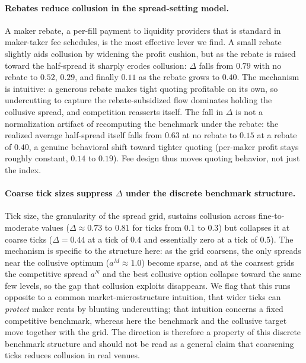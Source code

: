 \documentclass[sigconf]{acmart}
\begin{document}
\paragraph{Rebates reduce collusion in the spread-setting model.} A maker rebate, a per-fill payment to liquidity providers that is standard in maker-taker fee schedules, is the most effective lever we find. A small rebate slightly aids collusion by widening the profit cushion, but as the rebate is raised toward the half-spread it sharply erodes collusion: $\Delta$ falls from $0.79$ with no rebate to $0.52$, $0.29$, and finally $0.11$ as the rebate grows to $0.40$. The mechanism is intuitive: a generous rebate makes tight quoting profitable on its own, so undercutting to capture the rebate-subsidized flow dominates holding the collusive spread, and competition reasserts itself. The fall in $\Delta$ is not a normalization artifact of recomputing the benchmark under the rebate: the realized average half-spread itself falls from $0.63$ at no rebate to $0.15$ at a rebate of $0.40$, a genuine behavioral shift toward tighter quoting (per-maker profit stays roughly constant, $0.14$ to $0.19$). Fee design thus moves quoting behavior, not just the index.

\paragraph{Coarse tick sizes suppress $\Delta$ under the discrete benchmark structure.} Tick size, the granularity of the spread grid, sustains collusion across fine-to-moderate values ($\Delta \approx 0.73$ to $0.81$ for ticks from $0.1$ to $0.3$) but collapses it at coarse ticks ($\Delta = 0.44$ at a tick of $0.4$ and essentially zero at a tick of $0.5$). The mechanism is specific to the structure here: as the grid coarsens, the only spreads near the collusive optimum ($a^M \approx 1.0$) become sparse, and at the coarsest grids the competitive spread $a^N$ and the best collusive option collapse toward the same few levels, so the gap that collusion exploits disappears. We flag that this runs opposite to a common market-microstructure intuition, that wider ticks can \emph{protect} maker rents by blunting undercutting; that intuition concerns a fixed competitive benchmark, whereas here the benchmark and the collusive target move together with the grid. The direction is therefore a property of this discrete benchmark structure and should not be read as a general claim that coarsening ticks reduces collusion in real venues.
\end{document}
